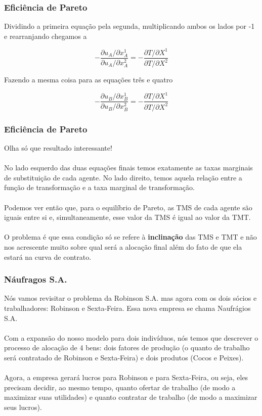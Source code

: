 \documentclass{beamer}[10]
\begin{document}
\begin{frame}
	\frametitle{Eficiência de Pareto}

	Dividindo a primeira equação pela segunda, multiplicando ambos os lados por -1 e rearranjando chegamos a

	$$ - \frac{\partial u_A/\partial x^1_A}{\partial u_A/\partial x^2_A} = - \frac{\partial T/\partial X^1}{\partial T/\partial X^2} $$

	Fazendo a mesma coisa para as equações três e quatro

	$$ - \frac{\partial u_B/\partial x^1_B}{\partial u_B/\partial x^2_B} = - \frac{\partial T/\partial X^1}{\partial T/\partial X^2} $$

\end{frame}

\begin{frame}
	\frametitle{Eficiência de Pareto}

	Olha só que resultado interessante!
	\\~\\
	No lado esquerdo das duas equações finais temos exatamente as taxas marginais de substituição de cada agente. No lado direito, temos aquela relação entre a função de transformação e a taxa marginal de transformação.
	\\~\\
	Podemos ver então que, para o equilíbrio de Pareto, as TMS de cada agente são iguais entre si e, simultaneamente, esse valor da TMS é igual ao valor da TMT.
	\\~\\
	O problema é que essa condição só se refere à \textbf{inclinação} das TMS e TMT e não nos acrescente muito sobre qual será a alocação final além do fato de que ela estará na curva de contrato.

\end{frame}

\begin{frame}
	\frametitle{Náufragos S.A.}

	Nós vamos revisitar o problema da Robinson S.A. mas agora com os dois sócios e trabalhadores: Robinson e Sexta-Feira. Essa nova empresa se chama Naufrágios S.A.
	\\~\\
	Com a expansão do nosso modelo para dois indivíduos, nós temos que descrever o processo de alocação de 4 bens: dois fatores de produção (o quanto de trabalho será contratado de Robinson e Sexta-Feira) e dois produtos (Cocos e Peixes).
	\\~\\
	Agora, a empresa gerará lucros para Robinson e para Sexta-Feira, ou seja, eles precisam decidir, ao mesmo tempo, quanto ofertar de trabalho (de modo a maximizar suas utilidades) e quanto contratar de trabalho (de modo a  maximizar seus lucros).	

\end{frame}
\end{document}
